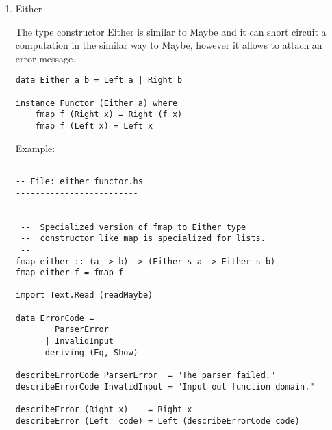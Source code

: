 \documentclass[11pt]{article}
\begin{document}
\begin{enumerate}
\begin{verbatim}
> fmap_f Nothing
Nothing
> 

> import Text.Read (readMaybe)


> readMaybe "100" :: Maybe Integer
Just 100
> 
> readMaybe "asd100" :: Maybe Integer
Nothing
> 

> let parseInteger str = readMaybe str :: Maybe Integer
> 
> :t parseInteger 
parseInteger :: String -> Maybe Integer
> 

> parseInteger "100" 
Just 100
> 
> parseInteger "Not a number" 
Nothing
>

> fmap (\x -> x + 10) (parseInteger "200")
Just 210
> 
> fmap (\x -> x + 10) (parseInteger "2sadas00")
Nothing
> 

 -- Specialized version of fmap 
 -- 
fmap_maybe :: (a -> b) -> (Maybe a -> Maybe b)
fmap_maybe func = fmap func 

> fmap_maybe (\x -> x + 10) (Just 10)
Just 20
> 

> fmap_maybe (\x -> x + 10) Nothing
Nothing
>
\end{verbatim}

\item Either
\label{sec-1-12-3-4}

The type constructor Either is similar to Maybe and it can short
circuit a computation in the similar way to Maybe, however it allows
to attach an error message. 

\begin{verbatim}
data Either a b = Left a | Right b 

instance Functor (Either a) where  
    fmap f (Right x) = Right (f x)  
    fmap f (Left x) = Left x
\end{verbatim}

Example:

\begin{verbatim}
--
-- File: either_functor.hs 
-------------------------

 
 --  Specialized version of fmap to Either type 
 --  constructor like map is specialized for lists.
 --
fmap_either :: (a -> b) -> (Either s a -> Either s b)
fmap_either f = fmap f

import Text.Read (readMaybe)

data ErrorCode = 
        ParserError 
      | InvalidInput 
      deriving (Eq, Show)

describeErrorCode ParserError  = "The parser failed." 
describeErrorCode InvalidInput = "Input out function domain."

describeError (Right x)    = Right x 
describeError (Left  code) = Left (describeErrorCode code)


\end{verbatim}
\end{enumerate}
\end{document}
